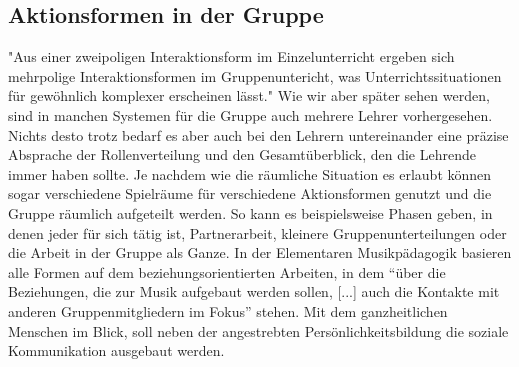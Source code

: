 \subsection{Aktionsformen in der Gruppe}
"Aus einer zweipoligen Interaktionsform im Einzelunterricht ergeben sich
mehrpolige Interaktionsformen im Gruppenuntericht, was Unterrichtssituationen
für gewöhnlich komplexer erscheinen lässt." \autocite[30]{losert:die_kunst_zu_unterrichten}
Wie wir aber später sehen werden, sind in manchen Systemen für die Gruppe auch
mehrere Lehrer vorhergesehen. Nichts desto trotz bedarf es aber auch bei den
Lehrern untereinander eine präzise Absprache der Rollenverteilung und den
Gesamtüberblick, den die Lehrende immer haben sollte. 
Je nachdem wie die räumliche Situation es erlaubt können sogar
verschiedene
Spielräume für verschiedene Aktionsformen genutzt und die Gruppe räumlich
aufgeteilt werden. So
kann es beispielsweise Phasen geben, in denen jeder für sich tätig ist,
Partnerarbeit, kleinere Gruppenunterteilungen oder die
Arbeit in der Gruppe als Ganze. In der Elementaren Musikpädagogik basieren alle
Formen auf dem beziehungsorientierten
Arbeiten, in dem \enquote{über die Beziehungen, die zur Musik aufgebaut werden sollen,
[...] auch die Kontakte mit anderen Gruppenmitgliedern im Fokus} 
\autocite[10]{dartsch:kern_des_musizierens} stehen. Mit dem ganzheitlichen Menschen im
Blick, soll neben der angestrebten Persönlichkeitsbildung die soziale
Kommunikation ausgebaut werden.


